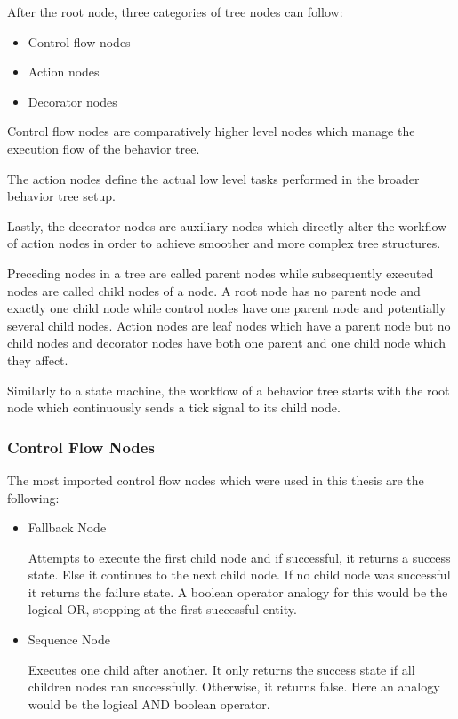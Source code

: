 After the root node, three categories of tree nodes can follow:

\begin{itemize}
    \item Control flow nodes
    \item Action nodes
    \item Decorator nodes
    \end{itemize}
    
    Control flow nodes are comparatively higher level nodes which manage the execution flow of the behavior tree.
    
    The action nodes define the actual low level tasks performed in the broader behavior tree setup. 
    
    Lastly, the decorator nodes are auxiliary nodes which directly alter the workflow of action nodes in order to achieve smoother and more complex tree structures.
    
    Preceding nodes in a tree are called parent nodes while subsequently executed nodes are called child nodes of a node. A root node has no parent node and exactly one child node while control nodes have one parent node and potentially several child nodes. Action nodes are leaf nodes which have a parent node but no child nodes and decorator nodes have both one parent and one child node which they affect.

    Similarly to a state machine, the workflow of a behavior tree starts with the root node which continuously sends a tick signal to its child node. 

\subsubsection{Control Flow Nodes}

The most imported control flow nodes which were used in this thesis are the following:

\begin{itemize}
    \item Fallback Node
    
    Attempts to execute the first child node and if successful, it returns a success state. Else it continues to the next child node. If no child node was successful it returns the failure state. A boolean operator analogy for this would be the logical OR, stopping at the first successful entity.
    \item Sequence Node
    
    Executes one child after another. It only returns the success state if all children nodes ran successfully. Otherwise, it returns false. Here an analogy would be the logical AND boolean operator.
\end{itemize}


